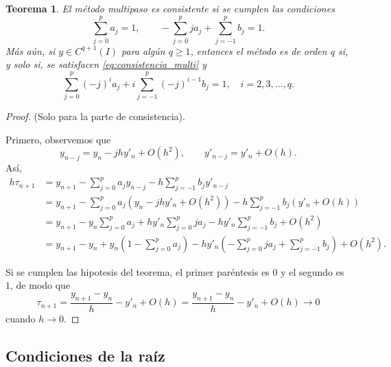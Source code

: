 \documentclass[11pt,letterpaper]{report}
\newtheorem{theorem}{Teorema}
\begin{document}
\begin{theorem}
  El método multipaso es consistente si se cumplen las condiciones
  \begin{equation}\label{eq:consistencia_multi}
    \sum_{j=0}^{p}a_j = 1,
    \qquad
    -\sum_{j=0}^{p}ja_j + \sum_{j=-1}^{p}b_j = 1.
  \end{equation}
  Más aún, si $y\in C^{q+1}(I)$ para algún $q\geq 1$, entonces el
  método es de orden $q$ si, y solo si, se satisfacen
  \eqref{eq:consistencia_multi} y
  \begin{equation}
    \sum_{j=0}^{p}(-j)^{i}a_j + i \sum_{j=-1}^{p}(-j)^{i-1}b_j = 1,
    \quad i=2,3,\dots,q
  .\end{equation}
\end{theorem}
\begin{proof}
  (Solo para la parte de consistencia).

  Primero, observemos que
  \begin{equation}
    y_{n-j} = y_{n} - jhy'_n + O(h^{2}),
    \qquad 
    y'_{n-j} = y'_n + O(h)
  .\end{equation}
  Así,
  \begin{align}
    h\tau_{n+1}
    &= y_{n+1}
    - \sum_{j=0}^{p}a_jy_{n-j}
    - h \sum_{j=-1}^{p}b_{j}y'_{n-j} \\
    &= y_{n+1}
    - \sum_{j=0}^{p}a_j(y_n - jhy'_n + O(h^{2}))
    - h \sum_{j=-1}^{p}b_{j}(y'_{n}+O(h)) \\
    &= y_{n+1}
    - y_n \sum_{j=0}^{p}a_j
    + hy'_n \sum_{j=0}^{p}ja_j
    - hy'_n \sum_{j=-1}^{p}b_{j} + O(h^{2})
    \\
    &= y_{n+1} - y_n
    + y_n\left(1-\sum_{j=0}^{p}a_j\right)
    - hy'_n
    \left( - \sum_{j=0}^{p}ja_j + \sum_{j=-1}^{p}b_{j} \right)
    + O(h^{2})
  .\end{align}
  
  Si se cumplen las hipotesis del teorema, el primer
  paréntesis es $0$ y el segundo es $1$, de modo que
  \begin{equation}
    \tau_{n+1}
    = \frac{y_{n+1} - y_n}{h} - y'_n + O(h)
    = \frac{y_{n+1} - y_n}{h} - y'_n + O(h)
    \to 0
  \end{equation}
  cuando $h\to 0$.
\end{proof}

\subsection{Condiciones de la raíz}
\end{document}
